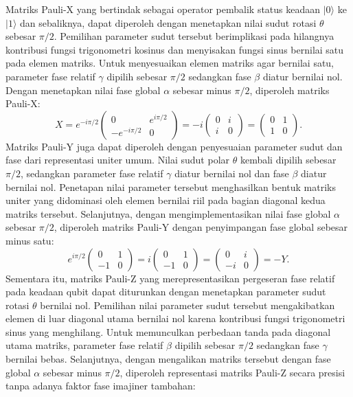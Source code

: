 Matriks Pauli-X yang bertindak sebagai operator pembalik status keadaan $|0\rangle$ ke $|1\rangle$ dan sebaliknya, dapat diperoleh dengan menetapkan nilai sudut rotasi $\theta$ sebesar $\pi/2$. Pemilihan parameter sudut tersebut berimplikasi pada hilangnya kontribusi fungsi trigonometri kosinus dan menyisakan fungsi sinus bernilai satu pada elemen matriks. Untuk menyesuaikan elemen matriks agar bernilai satu, parameter fase relatif $\gamma$ dipilih sebesar $\pi/2$ sedangkan fase $\beta$ diatur bernilai nol. Dengan menetapkan nilai fase global $\alpha$ sebesar minus $\pi/2$, diperoleh matriks Pauli-X:
\begin{equation}
X = e^{-i\pi/2} \begin{pmatrix} 0 & e^{i\pi/2} \\ -e^{-i\pi/2} & 0 \end{pmatrix} = -i \begin{pmatrix} 0 & i \\ i & 0 \end{pmatrix} = \begin{pmatrix} 0 & 1 \\ 1 & 0 \end{pmatrix}.
\end{equation}
Matriks Pauli-Y juga dapat diperoleh dengan penyesuaian parameter sudut dan fase dari representasi uniter umum. Nilai sudut polar $\theta$ kembali dipilih sebesar $\pi/2$, sedangkan parameter fase relatif $\gamma$ diatur bernilai nol dan fase $\beta$ diatur bernilai nol. Penetapan nilai parameter tersebut menghasilkan bentuk matriks uniter yang didominasi oleh elemen bernilai riil pada bagian diagonal kedua matriks tersebut. Selanjutnya, dengan mengimplementasikan nilai fase global $\alpha$ sebesar $\pi/2$, diperoleh matriks Pauli-Y dengan penyimpangan fase global sebesar minus satu:
\begin{equation}
e^{i\pi/2} \begin{pmatrix} 0 & 1 \\ -1 & 0 \end{pmatrix} = i \begin{pmatrix} 0 & 1 \\ -1 & 0 \end{pmatrix} = \begin{pmatrix} 0 & i \\ -i & 0 \end{pmatrix} = -Y.
\end{equation}
Sementara itu, matriks Pauli-Z yang merepresentasikan pergeseran fase relatif pada keadaan qubit dapat diturunkan dengan menetapkan parameter sudut rotasi $\theta$ bernilai nol. Pemilihan nilai parameter sudut tersebut mengakibatkan elemen di luar diagonal utama bernilai nol karena kontribusi fungsi trigonometri sinus yang menghilang. Untuk memunculkan perbedaan tanda pada diagonal utama matriks, parameter fase relatif $\beta$ dipilih sebesar $\pi/2$ sedangkan fase $\gamma$ bernilai bebas. Selanjutnya, dengan mengalikan matriks tersebut dengan fase global $\alpha$ sebesar minus $\pi/2$, diperoleh representasi matriks Pauli-Z secara presisi tanpa adanya faktor fase imajiner tambahan:
